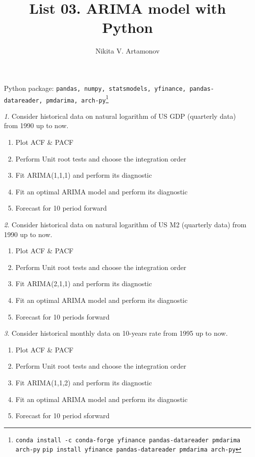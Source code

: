 \documentclass[12pt]{article}
\title{List 03. ARIMA model with Python}
\author{Nikita V. Artamonov}
\theoremstyle{remark}
\newtheorem{exercise}{}[section]
\begin{document}
\maketitle

Python package: \texttt{pandas, numpy, statsmodels, yfinance, 
pandas-datareader, pmdarima, arch-py}\footnote{\texttt{conda install -c conda-forge yfinance pandas-datareader pmdarima arch-py}
\texttt{pip install yfinance pandas-datareader pmdarima arch-py}}


\begin{exercise}
Consider historical data on natural logarithm of US GDP (quarterly data) from 1990 up to now.
\begin{enumerate}
	\item Plot ACF \& PACF 
	\item Perform Unit root tests and choose the integration order
	\item Fit ARIMA(1,1,1) and perform its diagnostic
	\item Fit an optimal ARIMA model and perform its diagnostic
	\item Forecast for 10 period forward
\end{enumerate}
\end{exercise}
	
\begin{exercise}
Consider historical data on natural logarithm of US M2 (quarterly data) from 1990 up to now.
\begin{enumerate}
	\item Plot ACF \& PACF 
	\item Perform Unit root tests and choose the integration order
	\item Fit ARIMA(2,1,1) and perform its diagnostic
	\item Fit an optimal ARIMA model and perform its diagnostic
	\item Forecast for 10 periods forward
\end{enumerate}
\end{exercise}
	
\begin{exercise}
Consider historical monthly data on 10-years rate from 1995 up to now.
\begin{enumerate}
	\item Plot ACF \& PACF 
	\item Perform Unit root tests and choose the integration order
	\item Fit ARIMA(1,1,2) and perform its diagnostic
	\item Fit an optimal ARIMA model and perform its diagnostic
	\item Forecast for 10 period sforward
\end{enumerate}
\end{exercise}
	
\end{document}
